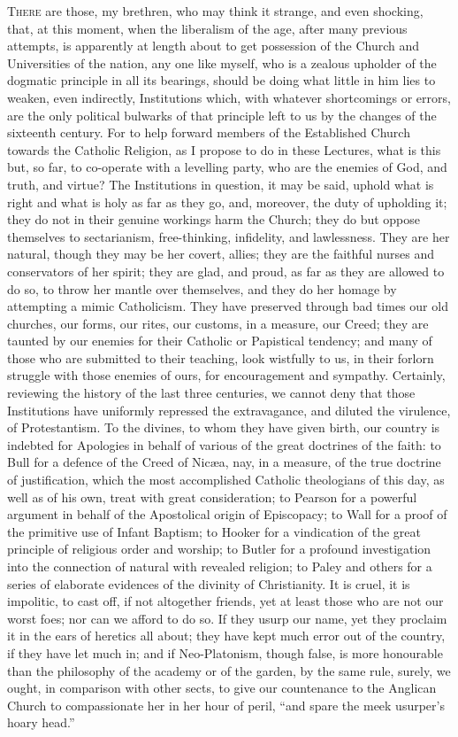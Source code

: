 T\textsc{here} are those, my brethren, who may think it strange, and even
shocking, that, at this moment, when the liberalism of the age, after
many previous attempts, is apparently at length about to get
possession of the Church and Universities of the nation, any one like
myself, who is a zealous upholder of the dogmatic principle in all its
bearings, should be doing what little in him lies to weaken, even
indirectly, Institutions which, with whatever shortcomings or errors,
are the only political bulwarks of that principle left to us by the
changes of the sixteenth century. For to help forward members of the
Established Church towards the Catholic Religion, as I propose to do
in these Lectures, what is this but, so far, to co-operate with a
levelling party, who are the enemies of God, and truth, and virtue?
The Institutions in question, it may be said, uphold what is right and
what is holy as far as they go, and, moreover, the duty of upholding
it; they do not in their genuine workings harm the Church; they do but
oppose themselves to sectarianism, free-thinking, infidelity, and
lawlessness. They are her natural, though they may be her covert,
allies; they are the faithful nurses and conservators of her spirit;
they are glad, and proud, as far as they are allowed to do so, to
throw her mantle over themselves, and they do her homage by attempting
a mimic Catholicism. They have preserved through bad times our old
churches, our forms, our rites, our customs, in a measure, our Creed;
they are taunted by our enemies for their Catholic or Papistical
tendency; and many of those who are submitted to their teaching, look
wistfully to us, in their forlorn struggle with those enemies of ours,
for encouragement and sympathy. Certainly, reviewing the history of
the last three centuries, we cannot deny that those Institutions have
uniformly repressed the extravagance, and diluted the virulence, of
Protestantism. To the divines, to whom they have given birth, our
country is indebted for Apologies in behalf of various of the great
doctrines of the faith: to Bull for a defence of the Creed of Nicæa,
nay, in a measure, of the true doctrine of justification, which the
most accomplished Catholic theologians of this day, as well as of his
own, treat with great consideration; to Pearson for a powerful
argument in behalf of the Apostolical origin of Episcopacy; to Wall
for a proof of the primitive use of Infant Baptism; to Hooker for a
vindication of the great principle of religious order and worship; to
Butler for a profound investigation into the connection of natural
with revealed religion; to Paley and others for a series of elaborate
evidences of the divinity of Christianity. It is cruel, it is
impolitic, to cast off, if not altogether friends, yet at least those
who are not our worst foes; nor can we afford to do so. If they usurp
our name, yet they proclaim it in the ears of heretics all about; they
have kept much error out of the country, if they have let much in; and
if Neo-Platonism, though false, is more honourable than the philosophy
of the academy or of the garden, by the same rule, surely, we ought,
in comparison with other sects, to give our countenance to the
Anglican Church to compassionate her in her hour of peril, ``and
spare the meek usurper's hoary head.''

